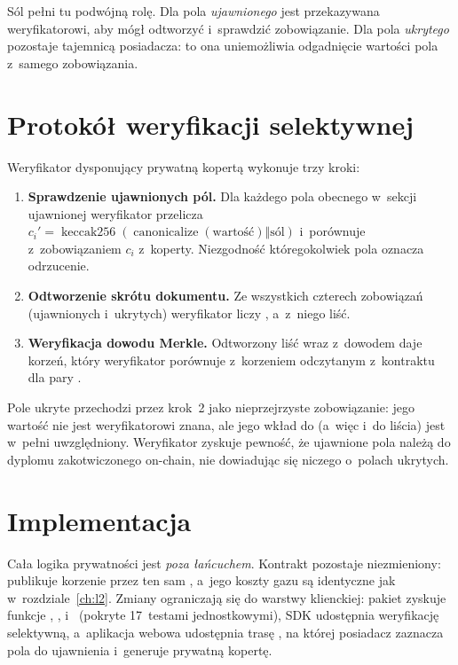 Sól pełni tu podwójną rolę. Dla pola \emph{ujawnionego} jest przekazywana
weryfikatorowi, aby mógł odtworzyć i~sprawdzić zobowiązanie. Dla pola
\emph{ukrytego} pozostaje tajemnicą posiadacza: to ona uniemożliwia odgadnięcie
wartości pola z~samego zobowiązania.

\section{Protokół weryfikacji selektywnej}
\label{sec:priv-protokol}

Weryfikator dysponujący prywatną kopertą wykonuje trzy kroki:

\begin{enumerate}
  \item \textbf{Sprawdzenie ujawnionych pól.} Dla każdego pola obecnego w~sekcji
        ujawnionej weryfikator przelicza $c_i' = \operatorname{keccak256}
        (\operatorname{canonicalize}(\text{wartość}) \Vert \text{sól})$ i~porównuje
        z~zobowiązaniem $c_i$ z~koperty. Niezgodność któregokolwiek pola oznacza
        odrzucenie.
  \item \textbf{Odtworzenie skrótu dokumentu.} Ze wszystkich czterech zobowiązań
        (ujawnionych i~ukrytych) weryfikator liczy , a~z~niego liść.
  \item \textbf{Weryfikacja dowodu Merkle.} Odtworzony liść wraz z~dowodem daje
        korzeń, który weryfikator porównuje z~korzeniem odczytanym z~kontraktu dla
        pary .
\end{enumerate}

Pole ukryte przechodzi przez krok~2 jako nieprzejrzyste zobowiązanie: jego wartość
nie jest weryfikatorowi znana, ale jego wkład do  (a~więc i~do
liścia) jest w~pełni uwzględniony. Weryfikator zyskuje pewność, że ujawnione pola
należą do dyplomu zakotwiczonego on-chain, nie dowiadując się niczego o~polach
ukrytych.

\section{Implementacja}
\label{sec:priv-implementacja}

Cała logika prywatności jest \emph{poza łańcuchem}. Kontrakt 
pozostaje niezmieniony: publikuje korzenie przez ten sam ,
a~jego koszty gazu są identyczne jak w~rozdziale~\ref{ch:l2}. Zmiany ograniczają się
do warstwy klienckiej: pakiet  zyskuje funkcje
, , 
i~ (pokryte 17~testami jednostkowymi), SDK udostępnia
weryfikację selektywną, a~aplikacja webowa udostępnia trasę , na której
posiadacz zaznacza pola do ujawnienia i~generuje prywatną kopertę.

